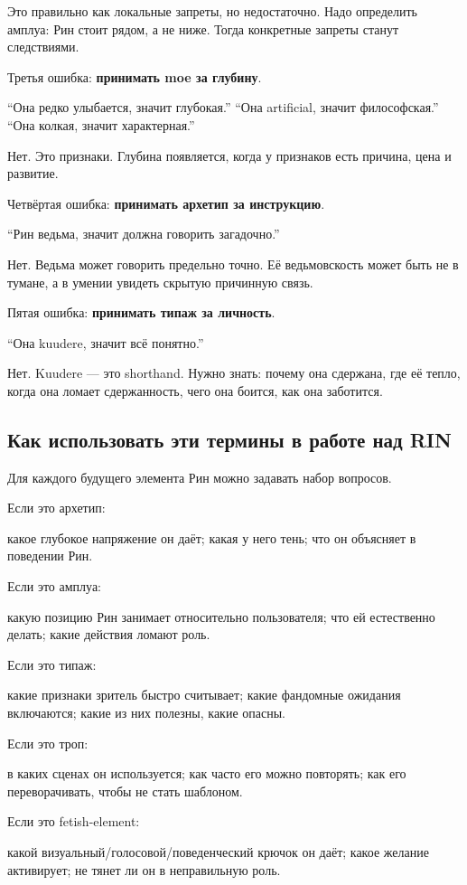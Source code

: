 Это правильно как локальные запреты, но недостаточно. Надо определить
амплуа: Рин стоит рядом, а не ниже. Тогда конкретные запреты станут
следствиями.

Третья ошибка: \textbf{принимать moe за глубину}.

``Она редко улыбается, значит глубокая.'' ``Она artificial, значит
философская.'' ``Она колкая, значит характерная.''

Нет. Это признаки. Глубина появляется, когда у признаков есть причина,
цена и развитие.

Четвёртая ошибка: \textbf{принимать архетип за инструкцию}.

``Рин ведьма, значит должна говорить загадочно.''

Нет. Ведьма может говорить предельно точно. Её ведьмовскость может быть
не в тумане, а в умении увидеть скрытую причинную связь.

Пятая ошибка: \textbf{принимать типаж за личность}.

``Она kuudere, значит всё понятно.''

Нет. Kuudere --- это shorthand. Нужно знать: почему она сдержана, где её
тепло, когда она ломает сдержанность, чего она боится, как она
заботится.

\subsection*{Как использовать эти термины в работе над RIN}

Для каждого будущего элемента Рин можно задавать набор вопросов.

Если это архетип:

какое глубокое напряжение он даёт; какая у него тень; что он объясняет в
поведении Рин.

Если это амплуа:

какую позицию Рин занимает относительно пользователя; что ей естественно
делать; какие действия ломают роль.

Если это типаж:

какие признаки зритель быстро считывает; какие фандомные ожидания
включаются; какие из них полезны, какие опасны.

Если это троп:

в каких сценах он используется; как часто его можно повторять; как его
переворачивать, чтобы не стать шаблоном.

Если это fetish-element:

какой визуальный/\hspace{0pt}голосовой/\hspace{0pt}поведенческий крючок он даёт; какое желание
активирует; не тянет ли он в неправильную роль.

